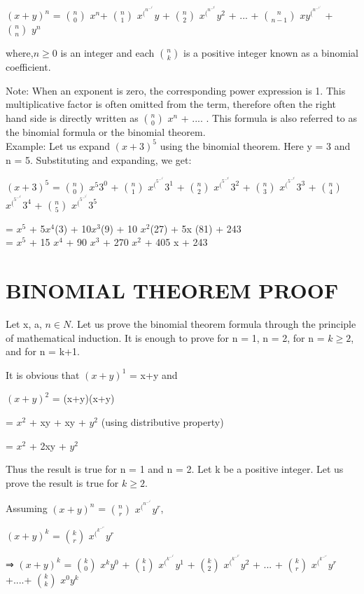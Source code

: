 \documentclass{article}
\begin{document}
$(x+y)^n$ = \(\binom{n}{0}\) $x^n$+ \(\binom{n}{1}\) $x^(^n^-^1^)y$ + \(\binom{n}{2}\) $x^(^n^-^2^) y^2$ + ... + \(\binom{n}{n-1}\) $xy^(^n^-^1^)$ + \(\binom{n}{n}\) $y^n$

where,$ n\geq 0$ is an integer and each \(\binom{n}{k}\) is a positive integer known as a binomial coefficient.

Note: When an exponent is zero, the corresponding power expression is 1. This multiplicative factor is often omitted from the term, therefore often the right hand side is directly written as \(\binom{n}{0}\) $x^n$ + .... . This formula is also referred to as the binomial formula or the binomial theorem.
\\
Example: Let us expand $(x+3)^5$ using the binomial theorem. Here y = 3 and n = 5. Substituting and expanding, we get:

$(x+3)^5$ =  \(\binom{n}{0}\) $x^5 3^0$ +  \(\binom{n}{1}\) $x^(^5^-^1^) 3^1$ +  \(\binom{n}{2}\) $x^(^5^-^2^) 3^2$ +  \(\binom{n}{3}\) $x^(^5^-^3^) 3^3$ +  \(\binom{n}{4}\) $x^(^5^-^4^) 3^4$ +  \(\binom{n}{5}\) $x^(^5^-^5^) 3^5$

= $x^5$ + 5$x^4$(3) + 10$x^3$(9) + 10 $x^2$(27) + 5x (81) + 243
\\
= $x^5$ + 15 $x^4$ + 90 $x^3$ + 270 $x^2$ + 405 x + 243
\section{BINOMIAL THEOREM PROOF}
Let x, a, $n \in N$. Let us prove the binomial theorem formula through the principle of mathematical induction. It is enough to prove for n = 1, n = 2, for n = $k \geq 2$, and for n = k+1.

It is obvious that $(x+y)^1$ = x+y and

$(x+y)^2$ = (x+y)(x+y)

= $x^2$ + xy + xy + $y^2$ (using distributive property)

= $x^2$ + 2xy + $y^2$

Thus the result is true for n = 1 and n = 2. Let k be a positive integer. Let us prove the result is true for $k \geq 2$.

Assuming $(x + y)^n$ = \sum  \(\binom{n}{r}\)  $x^(^n^-^r^) y^r$,

$(x + y)^k$ = \sum \(\binom{k}{r}\)  $x^(^k^-^r^) y^r$

⇒ $(x+y)^k$ =  \(\binom{k}{0}\)  $x^k y^0$ +  \(\binom{k}{1}\)  $x^(^k^-^1^) y^1$ +  \(\binom{k}{2}\)  $x^(^k^-^2^) y^2$ + ... +  \(\binom{k}{r}\)  $x^(^k^-^r^) y^r$ +....+  \(\binom{k}{k}\)  $x^0y^k$
\end{document}
